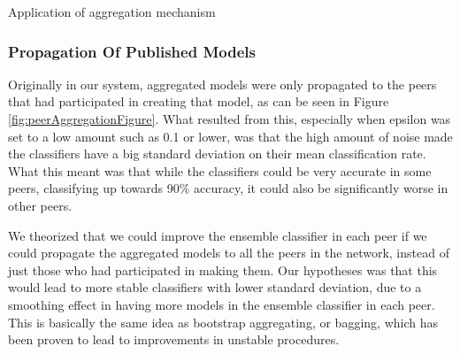 \begin{algorithm}[!h]
	\caption{Application of aggregation mechanism}
	\label{alg:aggregation_mechanism}
\end{algorithm}




\subsubsection{Propagation Of Published Models} \label{sec:PropagationPubModel}

Originally in our system, aggregated models were only propagated to the peers that had participated in creating that model, as can be seen in Figure \ref{fig:peerAggregationFigure}. What resulted from this, especially when epsilon was set to a low amount such as 0.1 or lower, was that the high amount of noise made the classifiers have a big standard deviation on their mean classification rate. What this meant was that while the classifiers could be very accurate in some peers, classifying up towards 90\% accuracy, it could also be significantly worse in other peers. 

We theorized that we could improve the ensemble classifier in each peer if we could propagate the aggregated models to all the peers in the network, instead of just those who had participated in making them. Our hypotheses was that this would lead to more stable classifiers with lower standard deviation, due to a smoothing effect in having more models in the ensemble classifier in each peer. This is basically the same idea as bootstrap aggregating, or bagging, which has been proven to lead to improvements in unstable procedures\citep{breiman1996bagging}. 

